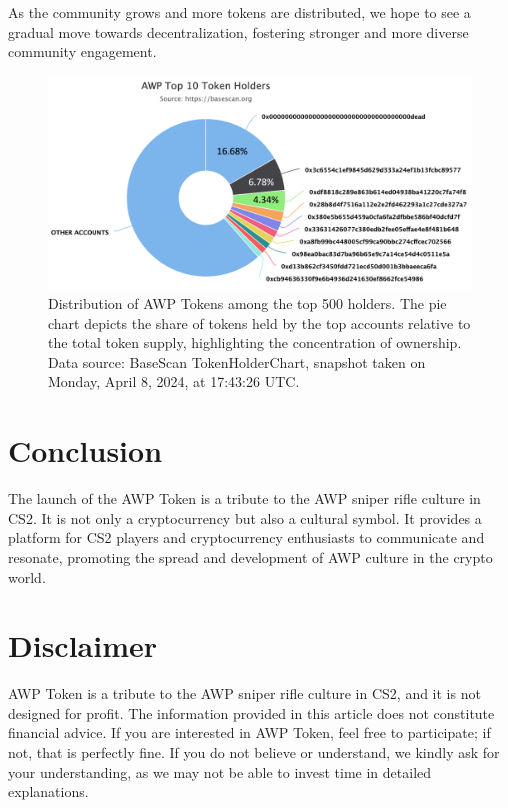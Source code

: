 \documentclass[journal,onecolumn,]{IEEEtran}
\begin{document}
	As the community grows and more tokens are distributed, we hope to see a gradual move towards decentralization, fostering stronger and more diverse community engagement.
	
	\begin{figure}[h]
		\centering
		\includegraphics[width=1\linewidth]{figure/token_distribution2.png}
		\caption{Distribution of AWP Tokens among the top 500 holders. The pie chart depicts the share of tokens held by the top accounts relative to the total token supply, highlighting the concentration of ownership. Data source: BaseScan TokenHolderChart, snapshot taken on Monday, April 8, 2024, at 17:43:26 UTC.}
		\label{pic:token_distribution}
	\end{figure}
	

	
	
	\section{Conclusion}
	The launch of the AWP Token is a tribute to the AWP sniper rifle culture in CS2. It is not only a cryptocurrency but also a cultural symbol. It provides a platform for CS2 players and cryptocurrency enthusiasts to communicate and resonate, promoting the spread and development of AWP culture in the crypto world.
	
	
	
	\section*{Disclaimer}
	
	AWP Token is a tribute to the AWP sniper rifle culture in CS2, and it is not designed for profit. The information provided in this article does not constitute financial advice. If you are interested in AWP Token, feel free to participate; if not, that is perfectly fine. If you do not believe or understand, we kindly ask for your understanding, as we may not be able to invest time in detailed explanations.
	
	
	\vfill
	
	 
	
	
	
	
	
\end{document}
